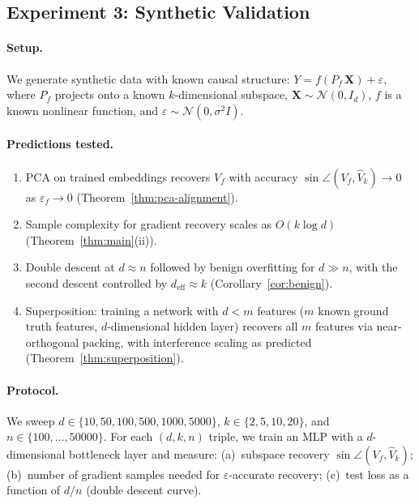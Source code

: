 \documentclass[11pt,a4paper]{article}
\theoremstyle{plain}
\theoremstyle{definition}
\theoremstyle{remark}
\newcommand{\cN}{\mathcal{N}}
\newcommand{\deff}{d_{\mathrm{eff}}}
\begin{document}
\subsection{Experiment 3: Synthetic Validation}\label{sec:exp-synthetic}

\paragraph{Setup.}
We generate synthetic data with known causal structure:
$Y = f(P_f\,\mathbf{X}) + \varepsilon$, where $P_f$ projects onto a known
$k$-dimensional subspace, $\mathbf{X} \sim \cN(0, I_d)$, $f$ is a known
nonlinear function, and $\varepsilon \sim \cN(0, \sigma^2 I)$.

\paragraph{Predictions tested.}
\begin{enumerate}[leftmargin=2em,itemsep=2pt]
  \item PCA on trained embeddings recovers $V_f$ with accuracy
    $\sin\angle(V_f, \hat{V}_k) \to 0$ as $\varepsilon_f \to 0$
    (Theorem~\ref{thm:pca-alignment}).
  \item Sample complexity for gradient recovery scales as $O(k\log d)$
    (Theorem~\ref{thm:main}(ii)).
  \item Double descent at $d \approx n$ followed by benign overfitting for
    $d \gg n$, with the second descent controlled by $\deff \approx k$
    (Corollary~\ref{cor:benign}).
  \item Superposition: training a network with $d < m$ features ($m$ known ground
    truth features, $d$-dimensional hidden layer) recovers all $m$ features via
    near-orthogonal packing, with interference scaling as predicted
    (Theorem~\ref{thm:superposition}).
\end{enumerate}

\paragraph{Protocol.}
We sweep $d \in \{10, 50, 100, 500, 1000, 5000\}$,
$k \in \{2, 5, 10, 20\}$, and $n \in \{100, \ldots, 50000\}$.  For each
$(d, k, n)$ triple, we train an MLP with a $d$-dimensional bottleneck layer and
measure: (a)~subspace recovery $\sin\angle(V_f, \hat{V}_k)$; (b)~number of
gradient samples needed for $\varepsilon$-accurate recovery; (c)~test loss as a
function of $d/n$ (double descent curve).
\end{document}
